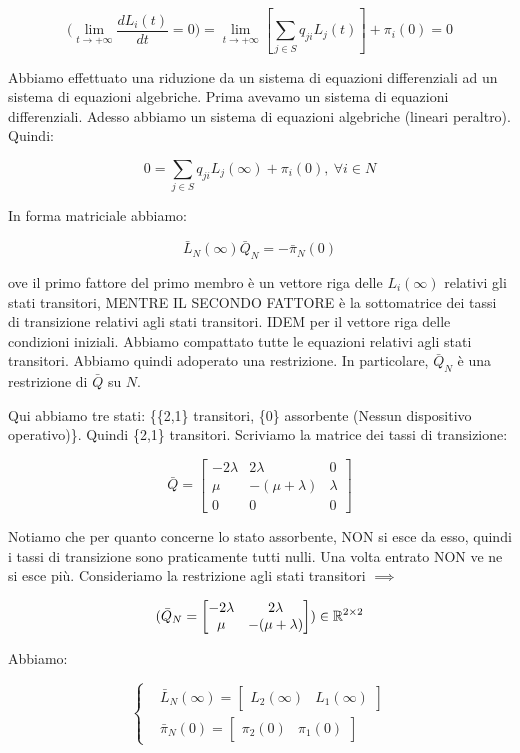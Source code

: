 \[
	(\lim_{t\to +\infty}{\frac{d L_i(t)}{dt} = 0)} = \lim_{t\to +\infty}{[\sum_{j\in S}{q_{ji}L_j(t)}]} + \pi_i(0) = 0
\]

Abbiamo effettuato una riduzione da un sistema di equazioni differenziali ad un sistema di equazioni algebriche. Prima avevamo un sistema di equazioni differenziali. Adesso abbiamo un sistema di equazioni algebriche (lineari peraltro). Quindi:

\[
	0 = \sum_{j\in S}{q_{ji}L_j(\infty)} + \pi_i(0),\ \forall i\in N
\]

In forma matriciale abbiamo:

\[
	\bar{L}_N(\infty)\bar{Q}_N = -\bar{\pi}_N(0)
\]

ove il primo fattore del primo membro è un vettore riga delle $L_i(\infty)$ relativi gli stati transitori, MENTRE IL SECONDO FATTORE è la sottomatrice dei tassi di transizione relativi agli stati transitori. IDEM per il vettore riga delle condizioni iniziali. Abbiamo compattato tutte le equazioni relativi agli stati transitori. Abbiamo quindi adoperato una restrizione. In particolare, $\bar{Q}_N$ è una restrizione di $\bar{Q}$ su $N$.

Qui abbiamo tre stati: \{\{2,1\} transitori, \{0\} assorbente (Nessun dispositivo operativo)\}. Quindi \{2,1\} transitori. Scriviamo la matrice dei tassi di transizione:

\[
	\bar{Q} = \begin{bmatrix}-2\lambda&2\lambda&0\\ \mu&-(\mu+\lambda)&\lambda\\0&0&0\end{bmatrix}
\]

Notiamo che per quanto concerne lo stato assorbente, NON si esce da esso, quindi i tassi di transizione sono praticamente tutti nulli. Una volta entrato NON ve ne si esce più. Consideriamo la restrizione agli stati transitori $\implies$
	
\[
	(\bar{Q}_N = \begin{bmatrix}-2\lambda&2\lambda\\ \mu&-(\mu+\lambda)\end{bmatrix}) \in\mathbb{R}^{2\times 2}
\]

Abbiamo:

\[
	\left\{
	\begin{aligned}
	&\bar{L}_N(\infty) = \begin{bmatrix}L_2(\infty)&L_1(\infty)\end{bmatrix}\\
	&\bar{\pi}_N(0) = \begin{bmatrix}\pi_2(0)&\pi_1(0)\end{bmatrix}
	\end{aligned}
	\right.
\]

